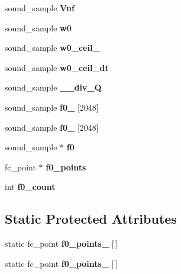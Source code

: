\begin{DoxyCompactItemize}
\item 
\hypertarget{classFilter_a5305e38fe8ba3b0f115b457552caec47}{sound\-\_\-sample {\bfseries Vnf}}\label{classFilter_a5305e38fe8ba3b0f115b457552caec47}

\item 
\hypertarget{classFilter_a5d93198345488ad9c4684abbba0f2b6a}{sound\-\_\-sample {\bfseries w0}}\label{classFilter_a5d93198345488ad9c4684abbba0f2b6a}

\item 
\hypertarget{classFilter_a0b09f9ec92b51794d0558a45a6dba3fc}{sound\-\_\-sample {\bfseries w0\-\_\-ceil\-\_}}\label{classFilter_a0b09f9ec92b51794d0558a45a6dba3fc}

\item 
\hypertarget{classFilter_a792be6606e75f11a8c04f8d3d7c026af}{sound\-\_\-sample {\bfseries w0\-\_\-ceil\-\_\-dt}}\label{classFilter_a792be6606e75f11a8c04f8d3d7c026af}

\item 
\hypertarget{classFilter_a88f13197f5ba68364d1ad3a8dc3577f4}{sound\-\_\-sample {\bfseries \-\_\-\_\-div\-\_\-\-Q}}\label{classFilter_a88f13197f5ba68364d1ad3a8dc3577f4}

\item 
\hypertarget{classFilter_af1a1bac1bfb213b8824ac767bd414790}{sound\-\_\-sample {\bfseries f0\-\_} \mbox{[}2048\mbox{]}}\label{classFilter_af1a1bac1bfb213b8824ac767bd414790}

\item 
\hypertarget{classFilter_afec6fc369aadecb0e334d4f1822e1507}{sound\-\_\-sample {\bfseries f0\-\_} \mbox{[}2048\mbox{]}}\label{classFilter_afec6fc369aadecb0e334d4f1822e1507}

\item 
\hypertarget{classFilter_acc2af2c35f3802d5e42555e78097f271}{sound\-\_\-sample $\ast$ {\bfseries f0}}\label{classFilter_acc2af2c35f3802d5e42555e78097f271}

\item 
\hypertarget{classFilter_aced1ee678f7e980046560d55dfd2cf0e}{fc\-\_\-point $\ast$ {\bfseries f0\-\_\-points}}\label{classFilter_aced1ee678f7e980046560d55dfd2cf0e}

\item 
\hypertarget{classFilter_a11c0f3e32c4e658e36bb911152970907}{int {\bfseries f0\-\_\-count}}\label{classFilter_a11c0f3e32c4e658e36bb911152970907}

\end{DoxyCompactItemize}
\subsection*{Static Protected Attributes}
\begin{DoxyCompactItemize}
\item 
\hypertarget{classFilter_aa3bbe6a692d8f6f58c0246bb1a1a743c}{static fc\-\_\-point {\bfseries f0\-\_\-points\-\_} \mbox{[}$\,$\mbox{]}}\label{classFilter_aa3bbe6a692d8f6f58c0246bb1a1a743c}

\item 
static fc\-\_\-point {\bfseries f0\-\_\-points\-\_} \mbox{[}$\,$\mbox{]}
\end{DoxyCompactItemize}
